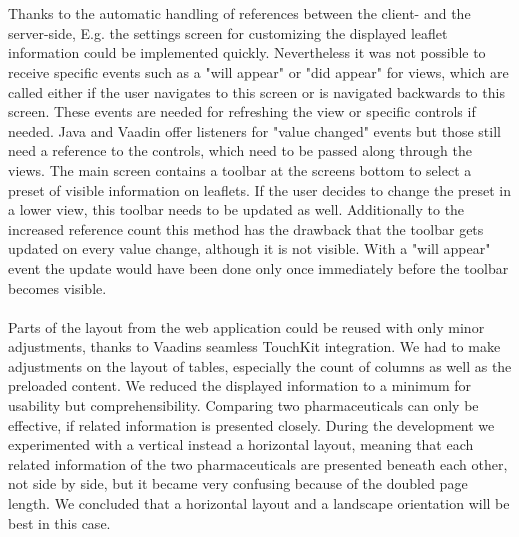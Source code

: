 \\
\\
Thanks to the automatic handling of references between the client- and the server-side, E.g. the settings screen for customizing the displayed leaflet information could be implemented quickly. Nevertheless it was not possible to receive specific events such as a "will appear" or "did appear" for views, which are called either if the user navigates to this screen or is navigated backwards to this screen. These events are needed for refreshing the view or specific controls if needed. Java and Vaadin offer listeners for "value changed" events but those still need a reference to the controls, which need to be passed along through the views. The main screen contains a toolbar at the screens bottom to select a preset of visible information on leaflets. If the user decides to change the preset in a lower view, this toolbar needs to be updated as well. Additionally to the increased reference count this method has the drawback that the toolbar gets updated on every value change, although it is not visible. With a "will appear" event the update would have been done only once immediately before the toolbar becomes visible.
\\
\\
Parts of the layout from the web application could be reused with only minor adjustments, thanks to Vaadins seamless TouchKit integration. We had to make adjustments on the layout of tables, especially the count of columns as well as the preloaded content. We reduced the displayed information to a minimum for usability but comprehensibility. Comparing two pharmaceuticals can only be effective, if related information is presented closely. During the development we experimented with a vertical instead a horizontal layout, meaning that each related information of the two pharmaceuticals are presented beneath each other, not side by side, but it became very confusing because of the doubled page length. We concluded that a horizontal layout and a landscape orientation will be best in this case.

